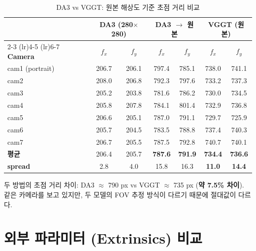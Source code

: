 \documentclass[11pt, a4paper]{report}
\begin{document}
\begin{table}[H]
\centering
\caption{DA3 vs VGGT: 원본 해상도 기준 초점 거리 비교}
\renewcommand{\arraystretch}{1.3}
\begin{tabular}{l cc cc cc}
\toprule
& \multicolumn{2}{c}{\textbf{DA3 (280$\times$280)}} & \multicolumn{2}{c}{\textbf{DA3 $\rightarrow$ 원본}} & \multicolumn{2}{c}{\textbf{VGGT (원본)}} \\
\cmidrule(lr){2-3} \cmidrule(lr){4-5} \cmidrule(lr){6-7}
\textbf{Camera} & $f_x$ & $f_y$ & $f_x$ & $f_y$ & $f_x$ & $f_y$ \\
\midrule
cam1 (portrait) & 206.7 & 206.1 & 797.4 & 785.1 & 738.0 & 741.1 \\
cam2 & 208.0 & 206.8 & 792.3 & 797.6 & 733.2 & 737.3 \\
cam3 & 205.2 & 203.8 & 781.6 & 786.2 & 730.0 & 734.5 \\
cam4 & 205.8 & 207.8 & 784.1 & 801.4 & 732.9 & 736.8 \\
cam5 & 206.6 & 205.1 & 787.0 & 791.1 & 729.7 & 725.9 \\
cam6 & 205.7 & 204.5 & 783.5 & 788.8 & 737.4 & 740.3 \\
cam7 & 206.7 & 205.5 & 787.5 & 792.8 & 740.7 & 740.1 \\
\midrule
\textbf{평균} & 206.4 & 205.7 & \textbf{787.6} & \textbf{791.9} & \textbf{734.4} & \textbf{736.6} \\
\textbf{spread} & 2.8 & 4.0 & 15.8 & 16.3 & \textbf{11.0} & \textbf{14.4} \\
\bottomrule
\end{tabular}
\end{table}

\begin{keyidea}
두 방법의 초점 거리 차이: DA3 $\approx$ 790 px vs VGGT $\approx$ 735 px (\textbf{약 7.5\% 차이}).
같은 카메라를 보고 있지만, 두 모델의 FOV 추정 방식이 다르기 때문에 절대값이 다르다.
\end{keyidea}


\section{외부 파라미터 (Extrinsics) 비교}
\end{document}
